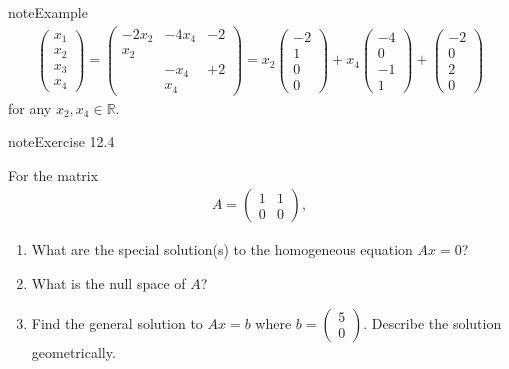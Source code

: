 \documentclass[letterpaper,10pt,english]{jupyterBook}
\begin{document}
\begin{sphinxadmonition}{note}{Example}
\begin{equation*}
\begin{split}
\begin{pmatrix}x_1\\x_2\\x_3\\x_4\end{pmatrix} = \begin{pmatrix}-2x_2&-4x_4&-2\\x_2&&\\&-x_4&+2\\&x_4&\end{pmatrix} = x_2\begin{pmatrix}-2\\1\\0\\0\end{pmatrix} + x_4\begin{pmatrix}-4\\0\\-1\\1\end{pmatrix} + \begin{pmatrix}-2\\0\\2\\0\end{pmatrix}
\end{split}
\end{equation*}
\sphinxAtStartPar
for any \(x_2, x_4 \in \mathbb{R}\).
\end{sphinxadmonition}
 \label{exercise:q_solve_system}

\begin{sphinxadmonition}{note}{Exercise 12.4}



\sphinxAtStartPar
For the matrix
\begin{equation*}
\begin{split}A = \begin{pmatrix}1 & 1 \\ 0 & 0\end{pmatrix},\end{split}
\end{equation*}\begin{enumerate}
%
\item {} 
\sphinxAtStartPar
What are the special solution(s) to the homogeneous equation \(Ax=0\)?

\item {} 
\sphinxAtStartPar
What is the null space of \(A\)?

\item {} 
\sphinxAtStartPar
Find the general solution to \(Ax = b\)  where \(b = \begin{pmatrix}5 \\ 0\end{pmatrix}\). Describe the solution geometrically.

\end{enumerate}
\end{sphinxadmonition}
\end{document}
